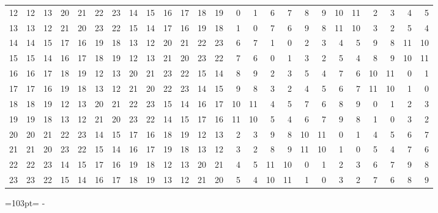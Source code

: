 \documentclass[10pt,a4paper]{article}
\newcommand{\needspace}[1]{\par\penalty-100\begingroup\dimen0=#1\relax\dimen2=\pagegoal
  \advance\dimen2-\pagetotal\ifdim\dimen0>\dimen2\relax\ifdim\dimen2>0pt\vfil\break\fi\fi
  \endgroup}
\numberwithin{equation}{section}
\begin{document}
{\begin{longtable}{@{}r|rrrrrrrrrrrrrrrrrrrrrrrr@{}}
12 & 12 & 13 & 20 & 21 & 22 & 23 & 14 & 15 & 16 & 17 & 18 & 19 & 0 & 1 & 6 & 7 & 8 & 9 & 10 & 11 & 2 & 3 & 4 & 5\\
13 & 13 & 12 & 21 & 20 & 23 & 22 & 15 & 14 & 17 & 16 & 19 & 18 & 1 & 0 & 7 & 6 & 9 & 8 & 11 & 10 & 3 & 2 & 5 & 4\\
14 & 14 & 15 & 17 & 16 & 19 & 18 & 13 & 12 & 20 & 21 & 22 & 23 & 6 & 7 & 1 & 0 & 2 & 3 & 4 & 5 & 9 & 8 & 11 & 10\\
15 & 15 & 14 & 16 & 17 & 18 & 19 & 12 & 13 & 21 & 20 & 23 & 22 & 7 & 6 & 0 & 1 & 3 & 2 & 5 & 4 & 8 & 9 & 10 & 11\\
16 & 16 & 17 & 18 & 19 & 12 & 13 & 20 & 21 & 23 & 22 & 15 & 14 & 8 & 9 & 2 & 3 & 5 & 4 & 7 & 6 & 10 & 11 & 0 & 1\\
17 & 17 & 16 & 19 & 18 & 13 & 12 & 21 & 20 & 22 & 23 & 14 & 15 & 9 & 8 & 3 & 2 & 4 & 5 & 6 & 7 & 11 & 10 & 1 & 0\\
18 & 18 & 19 & 12 & 13 & 20 & 21 & 22 & 23 & 15 & 14 & 16 & 17 & 10 & 11 & 4 & 5 & 7 & 6 & 8 & 9 & 0 & 1 & 2 & 3\\
19 & 19 & 18 & 13 & 12 & 21 & 20 & 23 & 22 & 14 & 15 & 17 & 16 & 11 & 10 & 5 & 4 & 6 & 7 & 9 & 8 & 1 & 0 & 3 & 2\\
20 & 20 & 21 & 22 & 23 & 14 & 15 & 17 & 16 & 18 & 19 & 12 & 13 & 2 & 3 & 9 & 8 & 10 & 11 & 0 & 1 & 4 & 5 & 6 & 7\\
21 & 21 & 20 & 23 & 22 & 15 & 14 & 16 & 17 & 19 & 18 & 13 & 12 & 3 & 2 & 8 & 9 & 11 & 10 & 1 & 0 & 5 & 4 & 7 & 6\\
22 & 22 & 23 & 14 & 15 & 17 & 16 & 19 & 18 & 12 & 13 & 20 & 21 & 4 & 5 & 11 & 10 & 0 & 1 & 2 & 3 & 6 & 7 & 9 & 8\\*
23 & 23 & 22 & 15 & 14 & 16 & 17 & 18 & 19 & 13 & 12 & 21 & 20 & 5 & 4 & 10 & 11 & 1 & 0 & 3 & 2 & 7 & 6 & 8 & 9\\
\bottomrule\end{longtable}}
\needspace{103pt}
\end{document}
